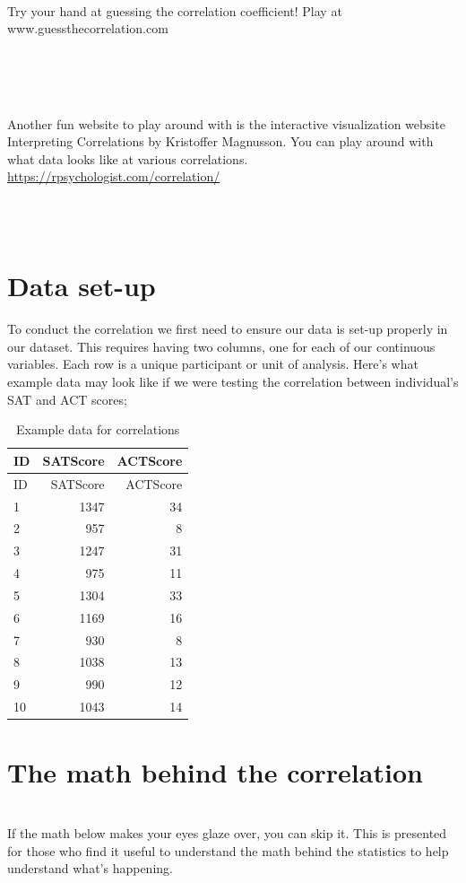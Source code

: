 \documentclass[
]{book}
\newenvironment{info}
    {
    \hline\\
    }
    { 
    \\\\\hline
    }
\newenvironment{try}
    {
    \hline\\
    }
    { 
    \\\\\hline
    }
\begin{document}
\begin{try}
Try your hand at guessing the correlation coefficient! Play at
www.guessthecorrelation.com
\end{try}

\begin{try}
Another fun website to play around with is the interactive visualization
website Interpreting Correlations by Kristoffer Magnusson. You can play
around with what data looks like at various correlations.
\url{https://rpsychologist.com/correlation/}
\end{try}

\hypertarget{data-set-up-4}{%
\section{Data set-up}\label{data-set-up-4}}

To conduct the correlation we first need to ensure our data is set-up properly in our dataset. This requires having two columns, one for each of our continuous variables. Each row is a unique participant or unit of analysis. Here's what example data may look like if we were testing the correlation between individual's SAT and ACT scores;

\begin{longtable}[]{@{}lrr@{}}
\caption{Example data for correlations}\tabularnewline
\toprule
ID & SATScore & ACTScore\tabularnewline
\midrule
\endfirsthead
\toprule
ID & SATScore & ACTScore\tabularnewline
\midrule
\endhead
1 & 1347 & 34\tabularnewline
2 & 957 & 8\tabularnewline
3 & 1247 & 31\tabularnewline
4 & 975 & 11\tabularnewline
5 & 1304 & 33\tabularnewline
6 & 1169 & 16\tabularnewline
7 & 930 & 8\tabularnewline
8 & 1038 & 13\tabularnewline
9 & 990 & 12\tabularnewline
10 & 1043 & 14\tabularnewline
\bottomrule
\end{longtable}

\hypertarget{the-math-behind-the-correlation}{%
\section{The math behind the correlation}\label{the-math-behind-the-correlation}}

\begin{info}
If the math below makes your eyes glaze over, you can skip it. This is
presented for those who find it useful to understand the math behind the
statistics to help understand what's happening.
\end{info}
\end{document}
